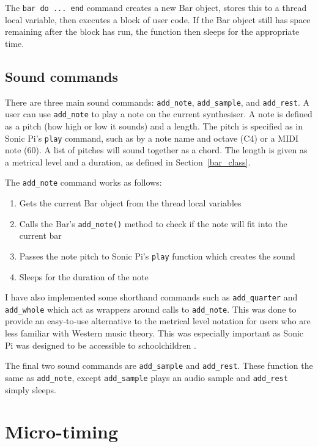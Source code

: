 \documentclass[12pt,twoside,openright]{report}
\begin{document}
The \verb'bar do ... end' command creates a new Bar object, stores this to a
thread local variable, then executes a block of user code. If the Bar object
still has space remaining after the block has run, the function then sleeps for
the appropriate time.


\subsection{Sound commands} \label{sound_commands}

There are three main sound commands: \verb'add_note', \verb'add_sample', and \verb'add_rest'. A
user can use \verb'add_note' to play a note on the current synthesiser. A note is
defined as a pitch (how high or low it sounds) and a length. The pitch is
specified as in Sonic Pi's \verb'play' command, such as by a note name and octave (C4)
or a MIDI note (60). A list of pitches will sound together as a chord. The
length is given as a metrical level and a duration, as defined in Section~\ref{bar_class}.

The \verb'add_note' command works as follows:
\begin{enumerate}
    \item Gets the current Bar object from the thread local variables
    \item Calls the Bar's \verb'add_note()' method to check if the note will fit into the current bar
    \item Passes the note pitch to Sonic Pi's \verb'play' function which creates the sound
    \item Sleeps for the duration of the note
\end{enumerate}

I have also implemented some shorthand commands such as \verb'add_quarter' and
\verb'add_whole' which act as wrappers around calls to \verb'add_note'. This was done to
provide an easy-to-use alternative to the metrical level notation for users who
are less familiar with Western music theory. This was especially important as
Sonic Pi was designed to be accessible to schoolchildren \cite{aaron2013}.

The final two sound commands are \verb'add_sample' and \verb'add_rest'. These function the
same as \verb'add_note', except \verb'add_sample' plays an audio sample and \verb'add_rest' simply sleeps.



\section{Micro-timing} \label{micro-timing_implementation}
\end{document}
